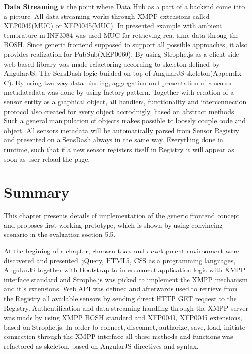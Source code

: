 \textbf{Data Streaming} is the point where Data Hub as a part of a backend come into a picture. All data streaming works through XMPP extensions called XEP0049(MUC) or XEP0045(MUC). In presented example with ambient temprature in INF3084 was used MUC for retrieving real-time data throug the BOSH. Since generic frontend supposed to support all possible approaches, it also provides realization for PubSub(XEP0060). By using Strophe.js as a client-side web-based library was made refactoring according to skeleton defined by AngularJS. 
\newline
The SensDash logic builded on top of AngularJS skeleton(Appendix C). By using two-way data binding, aggregation and presentation of a sensor metadatadata was done by using factory pattern. Together with creation of a sensor entity as a graphical object, all handlers, functionality and interconnection protocol also created for every object accrodnigly, based on abstract methods. Such a general manipulation of objects makes possible to loosely couple code and object. All sensors metadata will be automatically parsed from Sensor Registry and presented on a SensDash always in the same way. Everything done in runtime, such that if a new sensor registers itself in Registry it will appear as soon as user reload the page. 

\section{Summary}
This chapter presents details of implementation of the generic frontend concept and proposes first working prototype, which is shown by using convincing scenario in the evaluation section 5.5. 

At the begining of a chapter, choosen tools and development environment were discovered and presented: jQuery, HTML5, CSS as a programming languages, AngularJS together with Bootstrap to interconnect application logic with XMPP interface standard and Strophe.js was picked to implement the XMPP mechanism and it's extensions. Web API was defined and afterwards used to retrieve from the Registry all available sensors by sending direct HTTP GET request to the Registry. Authentification and data streaming handling through the XMPP server was made by using XMPP BOSH standard and XEP0049, XEP0045 extensions, based on Strophe.js. In order to connect, disconnet, authorize, save, load, initiate connection through the XMPP interface all these methods and functions was refactored as skeleton, based on AngularJS directives and syntax. 

